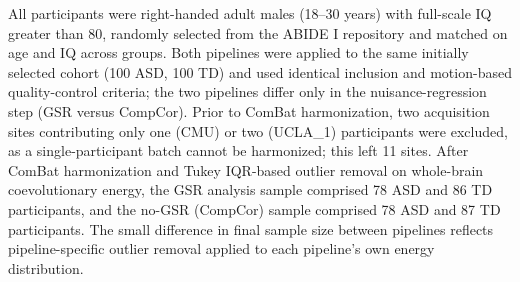 \documentclass[10pt,letterpaper]{article}
\begin{document}
\begin{table}[H]
\centering
\caption{Demographic and sampling characteristics of the study cohort.}
\label{tab:demographics}
\setlength{\tabcolsep}{3pt}
\small
{}
\begin{flushleft}
\footnotesize
All participants were right-handed adult males (18--30 years) with full-scale IQ greater than 80,
randomly selected from the ABIDE I repository and matched on age and IQ across groups. Both pipelines
were applied to the same initially selected cohort (100 ASD, 100 TD) and used identical inclusion and
motion-based quality-control criteria; the two pipelines differ only in the nuisance-regression step
(GSR versus CompCor). Prior to ComBat harmonization, two acquisition sites contributing only one
(CMU) or two (UCLA\_1) participants were excluded, as a single-participant batch cannot be
harmonized; this left 11 sites. After ComBat harmonization and Tukey IQR-based outlier removal on
whole-brain coevolutionary energy, the GSR analysis sample comprised 78 ASD and 86 TD participants,
and the no-GSR (CompCor) sample comprised 78 ASD and 87 TD participants. The small difference in
final sample size between pipelines reflects pipeline-specific outlier removal applied to each
pipeline's own energy distribution.
\end{flushleft}
\end{table}
\end{document}

